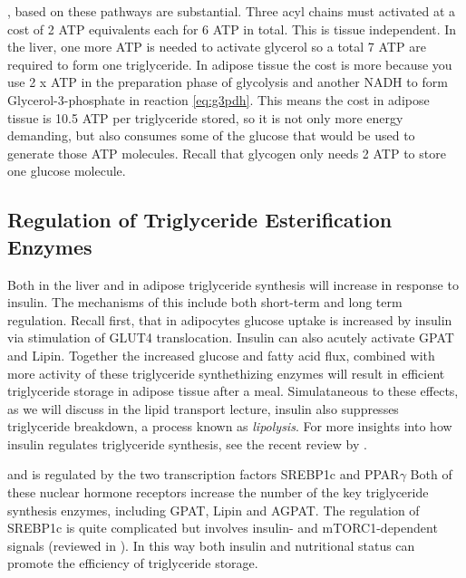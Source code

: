 \documentclass{tufte-handout}
\begin{document}
, based on these pathways are substantial.  Three acyl chains must activated at a cost of 2 ATP equivalents each for 6 ATP in total.  This is tissue independent. In the liver, one more ATP is needed to activate glycerol so a total 7 ATP are required to form one triglyceride.  In adipose tissue the cost is more because you use 2 x ATP in the preparation phase of glycolysis and another NADH to form Glycerol-3-phosphate in reaction \ref{eq:g3pdh}.  This means the cost in adipose tissue is 10.5 ATP per triglyceride stored, so it is not only more energy demanding, but also consumes some of the glucose that would be used to generate those ATP molecules.  Recall that glycogen only needs 2 ATP to store one glucose molecule.

\subsection{Regulation of Triglyceride Esterification Enzymes}  

Both in the liver and in adipose triglyceride synthesis will increase in response to insulin.  The mechanisms of this include both short-term and long term regulation.  Recall first, that in adipocytes glucose uptake is increased by insulin via stimulation of GLUT4 translocation.  Insulin can also acutely activate GPAT and Lipin.  Together the increased glucose and fatty acid flux, combined with more activity of these triglyceride synthethizing enzymes will result in efficient triglyceride storage in adipose tissue after a meal. Simulataneous to these effects, as we will discuss in the lipid transport lecture, insulin also suppresses triglyceride breakdown, a process known as \emph{lipolysis}.  For more insights into how insulin regulates triglyceride synthesis, see the recent review by \citet{Coleman2011}.

 and is regulated by the two transcription factors SREBP1c and PPAR$\gamma$  Both of these nuclear hormone receptors increase the number of the key triglyceride synthesis enzymes, including GPAT, Lipin and AGPAT.  The regulation of SREBP1c is quite complicated but involves insulin- and mTORC1-dependent signals (reviewed in \citet{Bakan2012}).  In this way both insulin and nutritional status can promote the efficiency of triglyceride storage.
\end{document}
